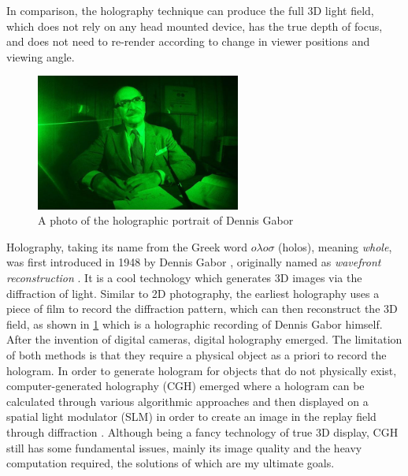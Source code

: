 In comparison, the holography technique can produce the full 3D light field, which does not rely on any head mounted device, has the true depth of focus, and does not need to re-render according to change in viewer positions and viewing angle.

\begin{figure}[H]
    \centering
    \includegraphics[width=0.6\textwidth]{Dennis-Gabor-Hologram-2.jpg}
    \caption{A photo of the holographic portrait of Dennis Gabor \cite{Lo2018}}\label{fig:Dennis-Gabor-Hologram-2}
\end{figure}

Holography, taking its name from the Greek word $o \lambda o \sigma $ (holos), meaning \textit{whole}, was first introduced in 1948 by Dennis Gabor \cite{Gabor1948}, originally named as \textit{wavefront reconstruction} \cite{Hecht2017}. It is a cool technology which generates 3D images via the diffraction of light. Similar to 2D photography, the earliest holography uses a piece of film to record the diffraction pattern, which can then reconstruct the 3D field, as shown in \cref{fig:Dennis-Gabor-Hologram-2} which is a holographic recording of Dennis Gabor himself. After the invention of digital cameras, digital holography emerged. The limitation of both methods is that they require a physical object as a priori to record the hologram. In order to generate hologram for objects that do not physically exist, computer-generated holography (CGH) emerged where a hologram can be calculated through various algorithmic approaches and then displayed on a spatial light modulator (SLM) in order to create an image in the replay field through diffraction \cite{Cable2006,Seldowitz1987,Yang2009,Gerchberg1972}. Although being a fancy technology of true 3D display, CGH still has some fundamental issues, mainly its image quality and the heavy computation required, the solutions of which are my ultimate goals.

